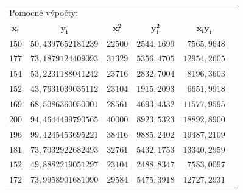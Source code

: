 \documentclass[a4paper, 11pt]{article}
\begin{document}
	\begin{table}[H]
		\centering
		\begin{tabular}{|r|r|r|r|r|r}
			\multicolumn{6}{l}{Pomocné výpočty:} \\[.5em] \cline{1-5}

			\multicolumn{1}{|c|}{$ \boldsymbol{x_i} $}
			& \multicolumn{1}{c|}{$ \boldsymbol{y_i} $}
			& \multicolumn{1}{c|}{$ \boldsymbol{x_i^2} $}
			& \multicolumn{1}{c|}{$ \boldsymbol{y_i^2} $}
			& \multicolumn{1}{c|}{$ \boldsymbol{x_i y_i} $}
			& \multicolumn{1}{l}{}
			\\ \cline{1-5} \cline{1-5}

			$ 150 $ & $ 50,4397652181239 $ & $ 22500 $ & $ 2544,1699 $
			& $ 7565,9648 $ & \multicolumn{1}{l}{} \\ \cline{1-5}

			$ 177 $ & $ 73,1879124409093 $ & $ 31329 $ & $ 5356,4705 $
			& $ 12954,2605 $ & \multicolumn{1}{l}{} \\ \cline{1-5}

			$ 154 $ & $ 53,2231188041242 $ & $ 23716 $ & $ 2832,7004 $
			& $ 8196,3603 $ & \multicolumn{1}{l}{} \\ \cline{1-5}

			$ 152 $ & $ 43,7631039035112 $ & $ 23104 $ & $ 1915,2093 $
			& $ 6651,9918 $ & \multicolumn{1}{l}{} \\ \cline{1-5}

			$ 169 $ & $ 68,5086360050001 $ & $ 28561 $ & $ 4693,4332 $
			& $ 11577,9595 $ & \multicolumn{1}{l}{} \\ \cline{1-5}

			$ 200 $ & $ 94,4644499790565 $ & $ 40000 $ & $ 8923,5323 $
			& $ 18892,8900 $ & \multicolumn{1}{l}{} \\ \cline{1-5}

			$ 196 $ & $ 99,4245453695221 $ & $ 38416 $ & $ 9885,2402 $
			& $ 19487,2109 $ & \multicolumn{1}{l}{} \\ \cline{1-5}

			$ 181 $ & $ 73,7032922682493 $ & $ 32761 $ & $ 5432,1753 $
			& $ 13340,2959 $ & \multicolumn{1}{l}{}\\ \cline{1-5}

			$ 152 $ & $ 49,8882219051297 $ & $ 23104 $ & $ 2488,8347 $
			& $ 7583,0097 $ & \multicolumn{1}{l}{} \\ \cline{1-5}

			$ 172 $ & $ 73,9958901681090 $ & $ 29584 $ & $ 5475,3918 $
			& $ 12727,2931 $ & \multicolumn{1}{l}{} \\ \cline{1-5}


\end{tabular}
\end{table}
\end{document}
